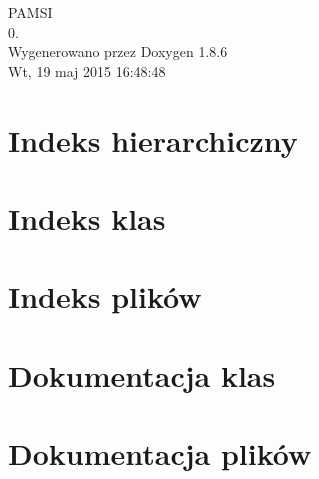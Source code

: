 \documentclass[twoside]{book}
\newcommand{\clearemptydoublepage}{%
  \newpage{\pagestyle{empty}\cleardoublepage}%
}
\begin{document}
\hypersetup{pageanchor=false}
\begin{titlepage}
\vspace*{7cm}
\begin{center}%
{\Large P\-A\-M\-S\-I \\[1ex]\large 0. }\\
\vspace*{1cm}
{\large Wygenerowano przez Doxygen 1.8.6}\\
\vspace*{0.5cm}
{\small Wt, 19 maj 2015 16:48:48}\\
\end{center}
\end{titlepage}
\clearemptydoublepage
\tableofcontents
\clearemptydoublepage
{}
\hypersetup{pageanchor=true}

\chapter{Indeks hierarchiczny}

\chapter{Indeks klas}

\chapter{Indeks plików}

\chapter{Dokumentacja klas}














\chapter{Dokumentacja plików}



































\newpage
{}
{}
\printindex
\end{document}
